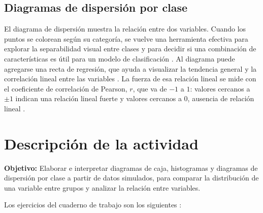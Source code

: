 \documentclass[11pt,letterpaper]{article}
\begin{document}
\subsection{Diagramas de dispersión por clase}

El diagrama de dispersión muestra la relación entre dos variables. Cuando los puntos se colorean según su categoría, se vuelve una herramienta efectiva para explorar la separabilidad visual entre clases y para decidir si una combinación de características es útil para un modelo de clasificación \parencite{tecnm2026_documento_fuente,brownlee2019}. Al diagrama puede agregarse una recta de regresión, que ayuda a visualizar la tendencia general y la correlación lineal entre las variables \parencite{tecnm2026_documento_fuente}. La fuerza de esa relación lineal se mide con el coeficiente de correlación de Pearson, $r$, que va de $-1$ a $1$: valores cercanos a $\pm 1$ indican una relación lineal fuerte y valores cercanos a 0, ausencia de relación lineal \parencite{bruce2020}.

\section{Descripción de la actividad}

\textbf{Objetivo:} Elaborar e interpretar diagramas de caja, histogramas y diagramas de dispersión por clase a partir de datos simulados, para comparar la distribución de una variable entre grupos y analizar la relación entre variables.

Los ejercicios del cuaderno de trabajo son los siguientes \parencite{tecnm2026_documento_fuente}:
\end{document}
